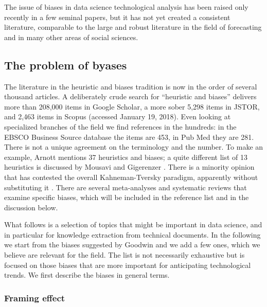 \documentclass[]{book}
\theoremstyle{definition}
\theoremstyle{definition}
\theoremstyle{definition}
\theoremstyle{remark}
\begin{document}
The issue of biases in data science technological analysis has been
raised only recently in a few seminal papers, but it has not yet created
a consistent literature, comparable to the large and robust literature
in the field of forecasting and in many other areas of social sciences.

\subsection{The problem of byases}\label{sotadocumentsunderstandbyas}

The literature in the heuristic and biases tradition is now in the order
of several thousand articles. A deliberately crude search for
``heuristic and biases'' delivers more than 208,000 items in Google
Scholar, a more sober 5,298 items in JSTOR, and 2,463 items in Scopus
(accessed January 19, 2018). Even looking at specialized branches of the
field we find references in the hundreds: in the EBSCO Business Source
database the items are 453, in Pub Med they are 281. There is not a
unique agreement on the terminology and the number. To make an example,
Arnott \citep{arnott1998decision} mentions 37 heuristics and biases; a
quite different list of 13 heuristics is discussed by Mousavi and
Gigerenzer \citep{mousavi2014risk}. There is a minority opinion that has
contested the overall Kahneman-Tversky \citep{kahneman2011thinking}
paradigm, apparently without substituting it \citep{gigerenzer1991make}.
There are several meta-analyses and systematic reviews that examine
specific biases, which will be included in the reference list and in the
discussion below.

What follows is a selection of topics that might be important in data
science, and in particular for knowledge extraction from technical
documents. In the following we start from the biases suggested by
Goodwin \citep{goodwin2015history} and we add a few ones, which we
believe are relevant for the field. The list is not necessarily
exhaustive but is focused on those biases that are more important for
anticipating technological trends. We first describe the biases in
general terms.

\subsubsection*{Framing effect}\label{framing-effect}
\end{document}
